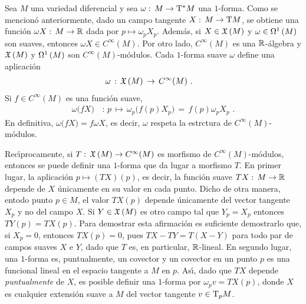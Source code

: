 \begin{obsUnoFormasYCampos}\label{obs:unoformasycampos}
	Sea $M$ una variedad diferencial y sea
	$\omega:\,M\rightarrow\tangente*{M}$ una $1$-forma. Como se
	mencion\'{o} anteriormente, dado un campo tangente
	$X:\,M\rightarrow\tangente{M}$, se obtiene una funci\'{o}n
	$\omega X:\,M\rightarrow\bb{R}$ dada por $p\mapsto\omega_{p}X_{p}$.
	Adem\'{a}s, si $X\in\champs{M}$ y $\omega\in\formes[1]{M}$ son
	suaves, entonces $\omega X\in C^{\infty}(M)$. Por otro lado,
	$C^{\infty}(M)$ es una $\bb{R}$-\'{a}lgebra y $\champs{M}$
	y $\formes[1]{M}$ son $C^{\infty}(M)$-m\'{o}dulos. Cada $1$-forma
	suave $\omega$ define una aplicaci\'{o}n
	\begin{align*}
		\omega & \,:\,\champs{M}\,\rightarrow\,C^{\infty}(M)
		\text{ .}
	\end{align*}
	Si $f\in C^{\infty}(M)$ es una funci\'{o}n suave,
	\begin{align*}
		\omega\big( fX\big) & \,:\,p\,\mapsto\,
			\omega_{p}\big(f(p)X_{p}\big) \,=\,
			f(p)\omega_{p}X_{p}
		\text{ .}
	\end{align*}
	En definitiva, $\omega\big(fX\big)=f\omega X$, es decir, $\omega$
	respeta la estrctura de $C^{\infty}(M)$-m\'{o}dulos.

	Rec\'{\i}procamente, si $T:\,\champs{M}\rightarrow C^{\infty}(M)$
	es morfismo de $C^{\infty}(M)$-m\'{o}dulos, entonces se puede
	definir una $1$-forma que da lugar a morfismo $T$. En primer lugar,
	la aplicaci\'{o}n $p\mapsto (TX)(p)$, es decir, la
	funci\'{o}n suave $TX:\,M\rightarrow\bb{R}$ depende de $X$
	\'{u}nicamente en su valor en cada punto. Dicho de otra manera,
	entodo punto $p\in M$, el valor $TX(p)$ depende \'{u}nicamente del
	vector tangente $X_{p}$ y no del campo $X$. Si $Y\in\champs{M}$ es
	otro campo tal que $Y_{p}=X_{p}$ entonces $TY(p)=TX(p)$. Para
	demostrar esta afirmaci\'{o}n es suficiente demostrarlo que,
	si $X_{p}=0$, entonces $TX(p)=0$, pues $TX-TY=T(X-Y)$ para todo
	par de campos suaves $X$ e $Y$, dado que $T$ es, en particular,
	$\bb{R}$-lineal. En segundo lugar, una $1$-forma es, puntualmente,
	un covector y un covector en un punto $p$ es una funcional lineal
	en el espacio tangente a $M$ en $p$. As\'{\i}, dado que $TX$ depende
	\emph{puntualmente} de $X$, es posible definir una $1$-forma
	por $\omega_{p}v=TX(p)$, donde $X$ es cualquier extensi\'{o}n
	suave a $M$ del vector tangente $v\in\tangente[p]{M}$.


\end{obsUnoFormasYCampos}
